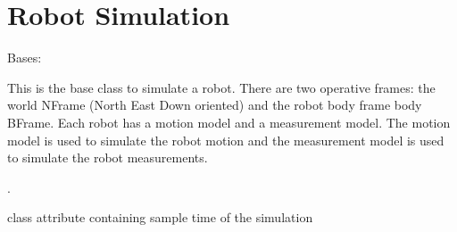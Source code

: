 \documentclass[letterpaper,10pt,english]{sphinxmanual}
\begin{document}
\begin{fulllineitems}
\begin{fulllineitems}
\begin{quote}
\begin{description}
\end{description}\end{quote}

\end{fulllineitems}


\end{fulllineitems}


\sphinxstepscope


\section{Robot Simulation}
\label{\detokenize{robot_simulation:robot-simulation}}\label{\detokenize{robot_simulation::doc}}

\begin{fulllineitems}
\label{\detokenize{robot_simulation:SimulatedRobot.SimulatedRobot}}
\pysigstartsignatures
{}
\pysigstopsignatures
\sphinxAtStartPar
Bases: 

\sphinxAtStartPar
This is the base class to simulate a robot. There are two operative frames: the world  N\sphinxhyphen{}Frame (North East Down oriented) and the robot body frame body B\sphinxhyphen{}Frame.
Each robot has a motion model and a measurement model. The motion model is used to simulate the robot motion and the measurement model is used to simulate the robot measurements.

\sphinxAtStartPar
{} .

\begin{fulllineitems}
\label{\detokenize{robot_simulation:SimulatedRobot.SimulatedRobot.dt}}
\pysigstartsignatures
{}
\pysigstopsignatures
\sphinxAtStartPar
class attribute containing sample time of the simulation

\end{fulllineitems}


\end{fulllineitems}
\end{document}
